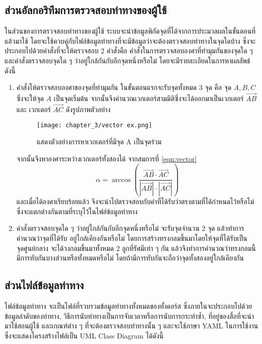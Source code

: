 \subsection{ส่วนอัลกอริทึมการตรวจสอบท่าทางของผู้ใช้}
ในส่วนของการตรวจสอบท่าทางของผู้ใช้ ระบบจะนำข้อมูลพิกัดจุดที่ได้จากการประมวลผลในขั้นตอนที่แล้วมาใช้ โดยจะใช้ควบคู่กับไฟล์ข้อมูลท่าทางที่จะมีข้อมูลว่าจะต้องตรวจสอบท่าทางในจุดใดบ้าง ซึ่งจะประกอบไปด้วยคำสั่งที่จะให้ตรวจสอบ 2 คำสั่งคือ คำสั่งในการตรวจสอบองศาที่ทำมุมกันของจุดใด ๆ และคำสั่งตรวจสอบจุดใด ๆ ว่าอยู่ใกล้กันกับอีกจุดหนึ่งหรือไม่ โดยจะมีรายละเอียดในการหาผลลัพธ์ ดังนี้
\begin{enumerate}
    \item 	คำสั่งให้ตรวจสอบองศาของจุดที่ทำมุมกัน ในขั้นตอนแรกจะรับจุดทั้งหมด 3 จุด คือ จุด $A,B,C$ ซึ่งจะให้จุด $A$ เป็นจุดเริ่มต้น จากนั้นจึงคำนวณเวกเตอร์สามมิติซึ่งจะได้ออกมาเป็นเวกเตอร์ $\overrightarrow{AB}$ และ เวกเตอร์ $\overrightarrow{AC}$ ดังรูปภาพตัวอย่าง
    \begin{figure}
        \texttt{[image: chapter\_3/vector ex.png]}
        \caption{แสดงตัวอย่างการหาเวกเตอร์ที่มีจุด A เป็นจุดร่วม}
    \end{figure}
    จากนั้นจึงหาองศาระหว่างเวกเตอร์ทั้งสองได้ จากสมการที่ \ref{eqn:vector}
    \begin{equation}
        \alpha = \arccos{\left( \frac{\overrightarrow{AB} \cdot \overrightarrow{AC}}{|\overrightarrow{AB}| \cdot |\overrightarrow{AC}|} \right)}
        \label{eqn:vector}
    \end{equation}
    และเมื่อได้องศาเรียบร้อยแล้ว จึงจะนำไปตรวจสอบกับค่าที่ได้รับว่าตรงตามที่ได้กำหนดไว้หรือไม่ ซึ่งจะแตกต่างกันตามที่ระบุไว้ในไฟล์ข้อมูลท่าทาง
    \item คำสั่งตรวจสอบจุดใด ๆ ว่าอยู่ใกล้กันกับอีกจุดหนึ่งหรือไม่ จะรับจุดจำนวน 2 จุด แล้วทำการคำนวณว่าจุดที่ได้รับ อยู่ใกล้เคียงกันหรือไม่ โดยการสร้างทรงกลมขึ้นมาโดยให้จุดที่ได้รับเป็นจุดศูนย์กลาง จะได้วงกลมขึ้นมาทั้งหมด 2 ลูกที่รัศมีเท่า ๆ กัน แล้วจึงทำการคำนวณว่าทรงกลมนี้มีการทับกันบางส่วนหรือทั้งหมดหรือไม่ โดยถ้ามีการทับกันจะถือว่าจุดทั้งสองอยู่ใกล้เคียงกัน
\end{enumerate}

\subsection{ส่วนไฟล์ข้อมูลท่าทาง}
ไฟล์ข้อมูลท่าทาง จะเป็นไฟล์ที่รวบรวมข้อมูลท่าทางทั้งหมดของทั้งคอร์ส ซึ่งภายในจะประกอบไปด้วยข้อมูลลำดับของท่าทาง, วิธีการนับท่าทางเป็นการจับเวลาหรือการนับการกระทำซ้ำ, ที่อยู่ของสื่อที่จะนำมาใช้สอนผู้ใช้ และเกณฑ์ต่าง ๆ ที่จะต้องตรวจสอบท่าทางนั้น ๆ และจะใช้ภาษา YAML ในการใช้งาน ซึ่งจะแสดงโครงสร้างไฟล์เป็น UML Class Diagram ได้ดังนี้

